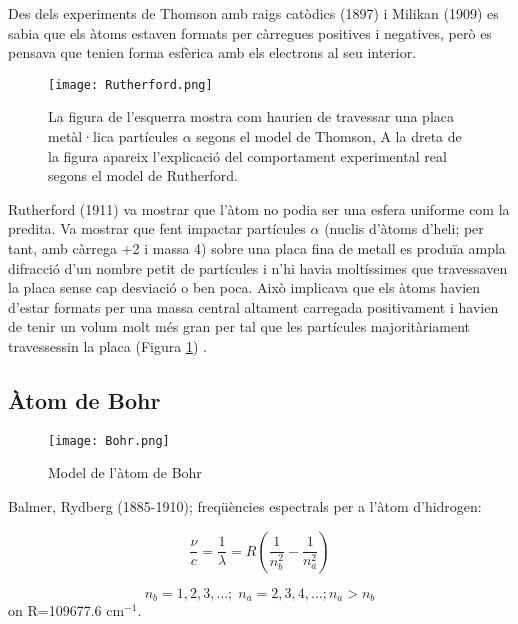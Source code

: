 Des dels experiments de Thomson amb raigs catòdics (1897) i Milikan (1909) es sabia que els àtoms estaven formats per càrregues positives i negatives, però es pensava que tenien forma esfèrica amb els electrons al seu interior.
\begin{figure}[h]
\centering
\texttt{[image: Rutherford.png]}
\caption[Model de Rutherford]{La figura de l'esquerra mostra com haurien de travessar una placa metàl·lica partícules $\alpha$ segons el model de Thomson, A la dreta de la figura apareix l'explicació del comportament experimental real segons el model de Rutherford.}
\label{fig:Rutherford}
\end{figure}
Rutherford (1911) va mostrar que l'àtom no podia ser una esfera uniforme com la predita. Va mostrar que fent impactar partícules $\alpha$ (nuclis d'àtoms d'heli; per tant, amb càrrega +2 i massa 4) sobre una placa fina de metall es produïa ampla difracció d'un nombre petit de partícules i n'hi havia moltíssimes que travessaven la placa sense cap desviació o ben poca. Això implicava que els àtoms havien d'estar formats per una massa central altament carregada positivament i havien de tenir un volum molt més gran per tal que les partícules majoritàriament travessessin la placa (Figura \ref{fig:Rutherford})
.

\subsection{Àtom de Bohr}

\begin{figure}[h]
\centering
\texttt{[image: Bohr.png]}
\caption{Model de l'àtom de Bohr}
\label{fig:Bohr}
\end{figure}

Balmer, Rydberg (1885-1910); freqüències espectrals per a l'àtom d'hidrogen:

\begin{equation}
\frac{\nu}{c}=\frac{1}{\lambda}=R\left( \frac{1}{n_b^2}-\frac{1}{n_a^2}\right)
\label{eq:rydberg}
\end{equation}

\[
n_b=1,2,3,\dots; \; n_a=2,3,4,\dots; n_a>n_b
\]
on R=109677.6 cm$^{-1}$.

